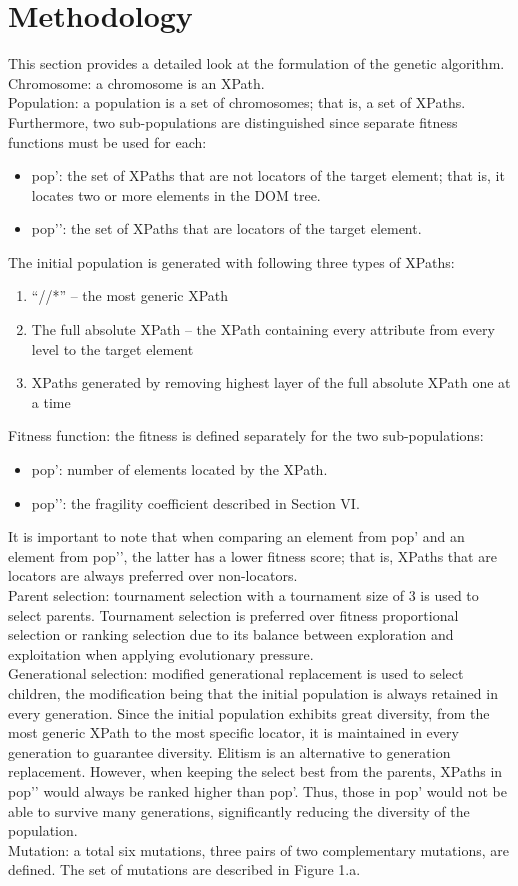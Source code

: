 \documentclass[format=acmlarge, nonacm=true]{acmart}
\begin{document}
\section{Methodology}
This section provides a detailed look at the formulation of the genetic algorithm.
Chromosome: a chromosome is an XPath.\\
Population: a population is a set of chromosomes; that is, a set of XPaths. Furthermore, two sub-populations are distinguished since separate fitness functions must be used for each:
\begin{itemize}
\item pop’: the set of XPaths that are not locators of the target element; that is, it locates two or more elements in the DOM tree.
\item pop’’: the set of XPaths that are locators of the target element.
\end{itemize}
The initial population is generated with following three types of XPaths:
\begin{enumerate}
	\item “//*” – the most generic XPath
	\item The full absolute XPath – the XPath containing every attribute from every level to the target element
	\item XPaths generated by removing highest layer of the full absolute XPath one at a time
\end{enumerate}
Fitness function: the fitness is defined separately for the two sub-populations:
\begin{itemize}
	\item pop’: number of elements located by the XPath.
	\item pop’’: the fragility coefficient described in Section VI.
\end{itemize}

It is important to note that when comparing an element from pop’ and an element from pop’’, the latter has a lower fitness score; that is, XPaths that are locators are always preferred over non-locators.\\
Parent selection: tournament selection with a tournament size of 3 is used to select parents. Tournament selection is preferred over fitness proportional selection or ranking selection due to its balance between exploration and exploitation when applying evolutionary pressure.\\
Generational selection: modified generational replacement is used to select children, the modification being that the initial population is always retained in every generation. Since the initial population exhibits great diversity, from the most generic XPath to the most specific locator, it is maintained in every generation to guarantee diversity. Elitism is an alternative to generation replacement. However, when keeping the select best from the parents, XPaths in pop’’ would always be ranked higher than pop’. Thus, those in pop’ would not be able to survive many generations, significantly reducing the diversity of the population.\\
Mutation: a total six mutations, three pairs of two complementary mutations, are defined. The set of mutations are described in Figure 1.a.\\
\end{document}
